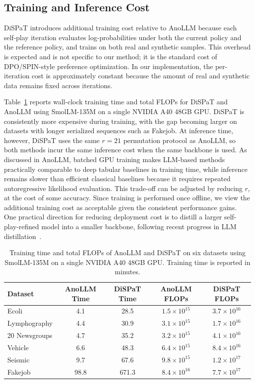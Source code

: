\subsection{Training and Inference Cost}
\label{sec:app:computational}

DiSPaT introduces additional training cost relative to AnoLLM because each self-play iteration evaluates log-probabilities under both the current policy and the reference policy, and trains on both real and synthetic samples. This overhead is expected and is not specific to our method; it is the standard cost of DPO/SPIN-style preference optimization. In our implementation, the per-iteration cost is approximately constant because the amount of real and synthetic data remains fixed across iterations.

Table~\ref{tab:computational_cost} reports wall-clock training time and total FLOPs for DiSPaT and AnoLLM using SmolLM-135M on a single NVIDIA A40 48GB GPU. DiSPaT is consistently more expensive during training, with the gap becoming larger on datasets with longer serialized sequences such as Fakejob. At inference time, however, DiSPaT uses the same $r=21$ permutation protocol as AnoLLM, so both methods incur the same inference cost when the same backbone is used. As discussed in AnoLLM, batched GPU training makes LLM-based methods practically comparable to deep tabular baselines in training time, while inference remains slower than efficient classical baselines because it requires repeated autoregressive likelihood evaluation. This trade-off can be adjusted by reducing $r$, at the cost of some accuracy. Since training is performed once offline, we view the additional training cost as acceptable given the consistent performance gains. One practical direction for reducing deployment cost is to distill a larger self-play-refined model into a smaller backbone, following recent progress in LLM distillation~\citep{yang2024anomaly, hoang2026mcw}.

\begin{table}[t]
\centering
\caption{Training time and total FLOPs of AnoLLM and DiSPaT on six datasets using SmolLM-135M on a single NVIDIA A40 48GB GPU. Training time is reported in minutes.}
\label{tab:computational_cost}
\small
\setlength{\tabcolsep}{8pt}
\begin{tabular}{lcccc}
\toprule
\textbf{Dataset} & \textbf{AnoLLM Time} & \textbf{DiSPaT Time} & \textbf{AnoLLM FLOPs} & \textbf{DiSPaT FLOPs} \\
\midrule
Ecoli & 4.1 & 28.5 & $1.5 \times 10^{15}$ & $3.7 \times 10^{16}$ \\
Lymphography & 4.4 & 30.9 & $3.1 \times 10^{15}$ & $1.7 \times 10^{16}$ \\
20 Newsgroups & 4.7 & 35.2 & $3.2 \times 10^{15}$ & $4.1 \times 10^{16}$ \\
Vehicle & 6.6 & 48.3 & $6.4 \times 10^{15}$ & $8.4 \times 10^{16}$ \\
Seismic & 9.7 & 67.6 & $9.8 \times 10^{15}$ & $1.2 \times 10^{17}$ \\
Fakejob & 98.8 & 671.3 & $8.4 \times 10^{16}$ & $7.7 \times 10^{17}$ \\
\bottomrule
\end{tabular}
\end{table}

